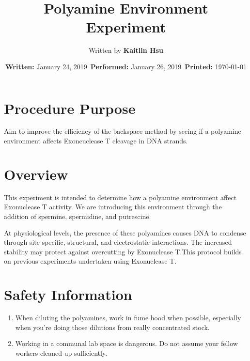\documentclass{ssiBio}
\title{Polyamine Environment Experiment} %
\author{Written by \textbf{Kaitlin Hsu}}
\date{\textbf{Written:} January 24, 2019 \,\textbf{Performed:} January 26, 2019 \,\textbf{Printed:} \today{}}
\begin{document}
\maketitle
\section{Procedure Purpose} %
Aim to improve the efficiency of the backspace method by seeing if a polyamine environment affects Exoncuclease T cleavage in DNA strands.
\section{Overview} %

This experiment is intended to determine how a polyamine environment affect Exonuclease T activity. We are introducing this environment through the addition of spermine, spermidine, and putrescine.

At physiological levels, the presence of these polyamines causes DNA to condense through site-specific, structural, and electrostatic interactions. The increased stability may protect against overcutting by Exonuclease T.This protocol builds on previous experiments undertaken using Exonuclease T. \cite{tomusiak} \cite{uttmark} \cite{ringach} \cite{tomusiak2}
\section{Safety Information}
\begin{safety}
\begin{enumerate}
\SYBRGOLD{}
\item{When diluting the polyamines, work in fume hood when possible, especially when you're doing those dilutions from really concentrated stock.}
\item{Working in a communal lab space is dangerous. Do not assume your fellow workers cleaned up sufficiently.}
\end{enumerate}
\end{safety}
\end{document}
